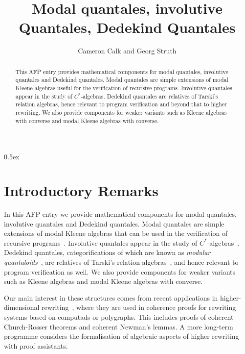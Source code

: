\documentclass[11pt,a4paper]{article}
\begin{document}
\title{Modal quantales, involutive Quantales, Dedekind Quantales}
\author{Cameron Calk and Georg Struth}
\maketitle

\begin{abstract}
  This AFP entry provides mathematical components for modal quantales,
  involutive quantales and Dedekind quantales. Modal quantales are
  simple extensions of modal Kleene algebras useful for the
  verification of recursive programs. Involutive quantales appear in
  the study of $C^\ast$-algebras. Dedekind quantales are relatives of
  Tarski's relation algebras, hence relevant to program verification
  and beyond that to higher  rewriting. We also provide
  components for weaker variants such as Kleene algebras with converse
  and modal Kleene algebras with converse.
\end{abstract}

\tableofcontents

\parindent 0pt\parskip 0.5ex


\section{Introductory Remarks}

In this AFP entry we provide mathematical components for modal
quantales, involutive quantales and Dedekind quantales. Modal
quantales are simple extensions of modal Kleene algebras that can be
used in the verification of recursive
programs~\cite{GomesS16}. Involutive quantales appear in the study of
$C^\ast$-algebras~\cite{Resende18}. Dedekind quantales,
categorifications of which are known as \emph{modular
  quantaloids}~\cite{Rosenthal96}, are relatives of Tarski's relation
algebras~\cite{Tarski41}, and hence relevant to program verification
as well. We also provide components for weaker variants such as Kleene
algebras and modal Kleene algebras with converse.

Our main interest in these structures comes from recent applications
in higher-dimensional rewriting~\cite{CalkGMS22,CalkMPS23}, where they
are used in coherence proofs for rewriting systems based on computads
or polygraphs. This includes proofs of coherent Church-Rosser theorems
and coherent Newman's lemmas. A more long-term programme considers
the formalisation of algebraic aspects of higher rewriting with proof
assistants.
\end{document}

